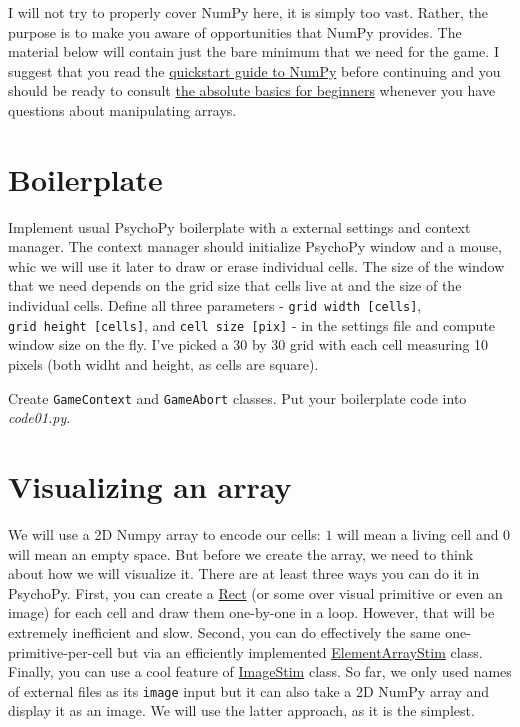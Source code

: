 \documentclass[
]{book}
\begin{document}
I will not try to properly cover NumPy here, it is simply too vast. Rather, the purpose is to make you aware of opportunities that NumPy provides. The material below will contain just the bare minimum that we need for the game. I suggest that you read the \href{https://numpy.org/doc/stable/user/quickstart.html}{quickstart guide to NumPy} before continuing and you should be ready to consult \href{https://numpy.org/doc/stable/user/absolute_beginners.html}{the absolute basics for beginners} whenever you have questions about manipulating arrays.

\hypertarget{boilerplate-3}{%
\section{Boilerplate}\label{boilerplate-3}}

Implement usual PsychoPy boilerplate with a external settings and context manager. The context manager should initialize PsychoPy window and a mouse, whic we will use it later to draw or erase individual cells. The size of the window that we need depends on the grid size that cells live at and the size of the individual cells. Define all three parameters - \texttt{grid\ width\ {[}cells{]}}, \texttt{grid\ height\ {[}cells{]}}, and \texttt{cell\ size\ {[}pix{]}} - in the settings file and compute window size on the fly. I've picked a 30 by 30 grid with each cell measuring 10 pixels (both widht and height, as cells are square).

Create \texttt{GameContext} and \texttt{GameAbort} classes.
Put your boilerplate code into \emph{code01.py}.

\hypertarget{visualizing-an-array}{%
\section{Visualizing an array}\label{visualizing-an-array}}

We will use a 2D Numpy array to encode our cells: \(1\) will mean a living cell and \(0\) will mean an empty space. But before we create the array, we need to think about how we will visualize it. There are at least three ways you can do it in PsychoPy. First, you can create a \href{https://psychopy.org/api/visual/rect.html\#psychopy.visual.rect.Rect}{Rect} (or some over visual primitive or even an image) for each cell and draw them one-by-one in a loop. However, that will be extremely inefficient and slow. Second, you can do effectively the same one-primitive-per-cell but via an efficiently implemented \href{https://psychopy.org/api/visual/elementarraystim.html\#psychopy.visual.ElementArrayStim}{ElementArrayStim} class. Finally, you can use a cool feature of \href{https://psychopy.org/api/visual/imagestim.html\#psychopy.visual.ImageStim}{ImageStim} class. So far, we only used names of external files as its \texttt{image} input but it can also take a 2D NumPy array and display it as an image. We will use the latter approach, as it is the simplest.
\end{document}

